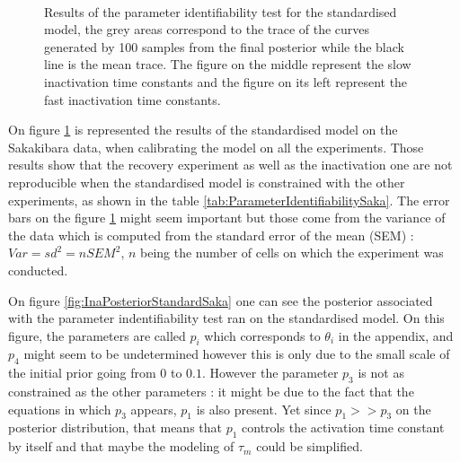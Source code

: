 \documentclass[11pt]{report}
\begin{document}
\begin{figure}[H]
\begin{subfigure}[b]{0.34\textwidth}
    \end{subfigure}
    ~
    \caption{Results of the parameter identifiability test for the standardised model, the grey areas correspond to the trace of the curves generated by 100 samples from the final posterior while the black line is the mean trace. The figure on the middle represent the slow inactivation time constants and the figure on its left represent the fast inactivation time constants.}
    \label{fig:resultsStandardised}
\end{figure}

On figure \ref{fig:resultsStandardised} is represented the results of the standardised model on the Sakakibara \cite{Sakakibara1992} data, when calibrating the model on all the experiments. Those results show that the recovery experiment as well as the inactivation one are not reproducible when the standardised model is constrained with the other experiments, as shown in the table \ref{tab:ParameterIdentifiabilitySaka}. The error bars on the figure \ref{fig:resultsStandardised} might seem important but those come from the variance of the data which is computed from the standard error of the mean (SEM) : $Var = sd^2 = nSEM^2$, $n$ being the number of cells on which the experiment was conducted.

On figure \ref{fig:InaPosteriorStandardSaka} one can see the posterior associated with the parameter indentifiability test ran on the standardised model. On this figure, the parameters are called $p_i$ which corresponds to $\theta_i$ in the appendix, and $p_4$ might seem to be undetermined however this is only due to the small scale of the initial prior going from 0 to $0.1$. However the parameter $p_3$ is not as constrained as the other parameters : it might be due to the fact that the equations in which $p_3$ appears, $p_1$ is also present. Yet since $p_1 >> p_3$ on the posterior distribution, that means that $p_1$ controls the activation time constant by itself and that maybe the modeling of $\tau_m$ could be simplified.
\end{document}
